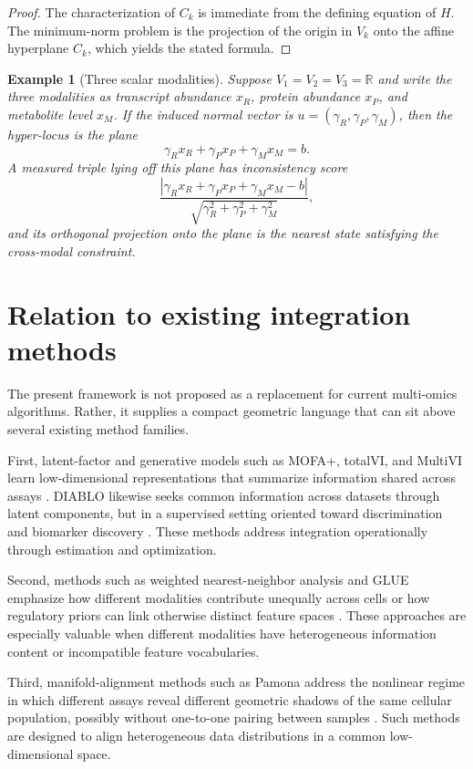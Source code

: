 \documentclass[11pt]{article}
\newtheorem{example}[definition]{Example}
\begin{document}
\begin{proof}
The characterization of $C_k$ is immediate from the defining equation of $H$. The minimum-norm problem is the projection of the origin in $V_k$ onto the affine hyperplane $C_k$, which yields the stated formula.
\end{proof}

\begin{example}[Three scalar modalities]\label{ex:three-scalar}
Suppose $V_1=V_2=V_3=\mathbb{R}$ and write the three modalities as transcript abundance $x_R$, protein abundance $x_P$, and metabolite level $x_M$. If the induced normal vector is $u=(\gamma_R,\gamma_P,\gamma_M)$, then the hyper-locus is the plane
\[
\gamma_R x_R + \gamma_P x_P + \gamma_M x_M = b.
\]
A measured triple lying off this plane has inconsistency score
\[
\frac{|\gamma_R x_R + \gamma_P x_P + \gamma_M x_M - b|}{\sqrt{\gamma_R^2+\gamma_P^2+\gamma_M^2}},
\]
and its orthogonal projection onto the plane is the nearest state satisfying the cross-modal constraint.
\end{example}

\section{Relation to existing integration methods}

The present framework is not proposed as a replacement for current multi-omics algorithms. Rather, it supplies a compact geometric language that can sit above several existing method families.

First, latent-factor and generative models such as MOFA+, totalVI, and MultiVI learn low-dimensional representations that summarize information shared across assays \cite{Argelaguet2020,Gayoso2021,Ashuach2023}. DIABLO likewise seeks common information across datasets through latent components, but in a supervised setting oriented toward discrimination and biomarker discovery \cite{Singh2019}. These methods address integration operationally through estimation and optimization.

Second, methods such as weighted nearest-neighbor analysis and GLUE emphasize how different modalities contribute unequally across cells or how regulatory priors can link otherwise distinct feature spaces \cite{Hao2021,Cao2022}. These approaches are especially valuable when different modalities have heterogeneous information content or incompatible feature vocabularies.

Third, manifold-alignment methods such as Pamona address the nonlinear regime in which different assays reveal different geometric shadows of the same cellular population, possibly without one-to-one pairing between samples \cite{CaoHong2022}. Such methods are designed to align heterogeneous data distributions in a common low-dimensional space.
\end{document}
